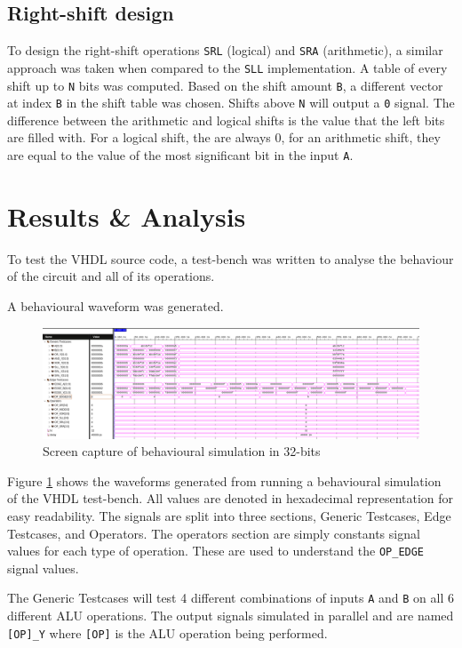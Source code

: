 \documentclass[CMPE]{../KGCOEReport}
\def\code#1{\texttt{#1}}
\begin{document}
    \subsection*{Right-shift design}
    To design the right-shift operations \code{SRL} (logical) and \code{SRA} (arithmetic), a similar approach was
    taken when compared to the \code{SLL} implementation.
    A table of every shift up to \code{N} bits was computed.
    Based on the shift amount \code{B}, a different vector at index \code{B} in the shift table was chosen.
    Shifts above \code{N} will output a \code{0} signal.
    The difference between the arithmetic and logical shifts is the value that the left bits are filled with.
    For a logical shift, the are always 0, for an arithmetic shift, they are equal to the value of the most significant
    bit in the input \code{A}.

    \section*{Results \& Analysis}
    To test the VHDL source code, a test-bench was written to analyse the behaviour of the circuit and all of its
    operations.

    A behavioural waveform was generated.

    \begin{figure}[h!]
        \centering
        \includegraphics[width=\textwidth]{img/behaviour_32}
        \caption{Screen capture of behavioural simulation in 32-bits}
        \label{fig:behave}
    \end{figure}

    Figure \ref{fig:behave} shows the waveforms generated from running a behavioural simulation of the VHDL
    test-bench.
    All values are denoted in hexadecimal representation for easy readability.
    The signals are split into three sections, Generic Testcases, Edge Testcases, and Operators.
    The operators section are simply constants signal values for each type of operation.
    These are used to understand the \code{OP\_EDGE} signal values.

    The Generic Testcases will test 4 different combinations of inputs \code{A} and \code{B} on all 6
    different ALU operations.
    The output signals simulated in parallel and are named \code{[OP]\_Y} where \code{[OP]} is the ALU operation
    being performed.
\end{document}
